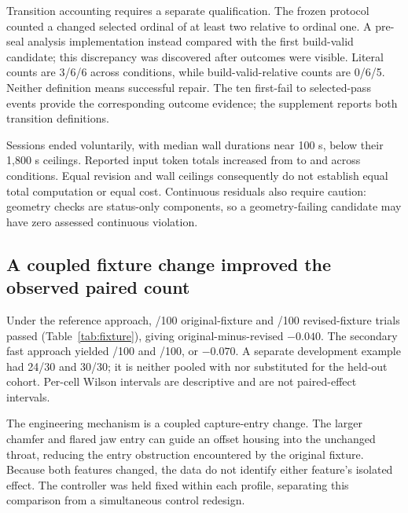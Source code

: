 Transition accounting requires a separate qualification. The frozen protocol counted a changed selected ordinal of at least two relative to ordinal one. A pre-seal analysis implementation instead compared with the first build-valid candidate; this discrepancy was discovered after outcomes were visible. Literal counts are 3/6/6 across conditions, while build-valid-relative counts are 0/6/5. Neither definition means successful repair. The ten first-fail to selected-pass events provide the corresponding outcome evidence; the supplement reports both transition definitions.

Sessions ended voluntarily, with median wall durations near 100 s, below their 1,800 s ceilings. Reported input token totals increased from \TokensCad{} to \TokensAggregate{} and \TokensStructured{} across conditions. Equal revision and wall ceilings consequently do not establish equal total computation or equal cost. Continuous residuals also require caution: geometry checks are status-only components, so a geometry-failing candidate may have zero assessed continuous violation.

\subsection{A coupled fixture change improved the observed paired count}
\begin{table}[tb]
\centering\small
\caption{Previously collected held-out simulated placement outcomes. Rows are separate controller profiles. The last column is original minus revised success proportion on shared draws; the coupled chamfer-and-flare intervention is not decomposable from these data.}
\label{tab:fixture}
\end{table}
Under the reference approach, \ETwoReferenceOriginal{}/100 original-fixture and \ETwoReferenceRevised{}/100 revised-fixture trials passed (Table~\ref{tab:fixture}), giving original-minus-revised $-0.040$. The secondary fast approach yielded \ETwoFastOriginal{}/100 and \ETwoFastRevised{}/100, or $-0.070$. A separate development example had 24/30 and 30/30; it is neither pooled with nor substituted for the held-out cohort. Per-cell Wilson intervals are descriptive and are not paired-effect intervals.

The engineering mechanism is a coupled capture-entry change. The larger chamfer and flared jaw entry can guide an offset housing into the unchanged throat, reducing the entry obstruction encountered by the original fixture. Because both features changed, the data do not identify either feature's isolated effect. The controller was held fixed within each profile, separating this comparison from a simultaneous control redesign.


